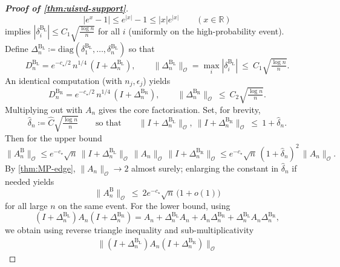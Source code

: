 \documentclass[11pt,a4paper]{article}
\newcommand{\op}{\mathcal{O}}
\newcommand{\diag}{\mathrm{diag}}
\begin{document}
\begin{proof}[\textbf{Proof of \cref{thm:uisvd-support}}]
\begin{equation}
|e^x-1|\le e^{|x|}-1\le |x|e^{|x|}\qquad (x\in\mathbb{R})
\end{equation}
implies $|\delta^{\mathrm{B_L}}_i|\le C_1\sqrt{\tfrac{\log n}{n}}$ for all $i$ (uniformly on the high-probability event). Define $\Delta^{\mathrm{B_L}}_{n}\coloneq \diag(\delta^{\mathrm{B_L}}_{1},\dots,\delta^{\mathrm{B_L}}_{n})$ so that
\begin{equation}\label{eq:DU-L-bnd}
D^{\mathrm{B_L}}_{n}=e^{-c_\star/2}\,n^{1/4}\,(I+\Delta^{\mathrm{B_L}}_{n}),
\qquad \|\Delta^{\mathrm{B_L}}_{n}\|_{\op}=\max_i|\delta^{\mathrm{B_L}}_i|\ \le\ C_1\sqrt{\tfrac{\log n}{n}}.
\end{equation}
An identical computation (with $n_j,\epsilon_j$) yields
\begin{equation}\label{eq:DU-R-bnd}
D^{\mathrm{B_R}}_{n}=e^{-c_\star/2}\,n^{1/4}\,(I+\Delta^{\mathrm{B_R}}_{n}),
\qquad \|\Delta^{\mathrm{B_R}}_{n}\|_{\op}\ \le\ C_2\sqrt{\tfrac{\log n}{n}}.
\end{equation}
Multiplying out with $A_n$ gives the core factorisation. Set, for brevity,
\begin{equation}
\hat \delta_n\coloneq \hat C\sqrt{\tfrac{\log n}{n}}\qquad\text{so that}\qquad
\|I+\Delta^{\mathrm{B_L}}_{n}\|_{\op},\ \|I+\Delta^{\mathrm{B_R}}_{n}\|_{\op}\ \le\ 1+\hat \delta_n.
\end{equation}
Then for the upper bound
\begin{equation}
\|A^{\mathrm{B}}_n\|_{\op}
\le e^{-c_\star}\sqrt n\,\|I+\Delta^{\mathrm{B_L}}_{n}\|_{\op}\,\|A_n\|_{\op}\,\|I+\Delta^{\mathrm{B_R}}_{n}\|_{\op}
\le e^{-c_\star}\sqrt n\,(1+\hat \delta_n)^2\,\|A_n\|_{\op}.
\end{equation}
By \cref{thm:MP-edge}, $\|A_n\|_{\op}\to 2$ almost surely; enlarging the constant in $\hat \delta_n$ if needed yields
\begin{equation}
\|A^{\mathrm{B}}_n\|_{\op}\ \le\ 2e^{-c_\star}\sqrt n\,\big(1+o(1)\big)
\end{equation}
for all large $n$ on the same event. For the lower bound, using
\begin{equation}
(I+\Delta^{\mathrm{B_L}}_{n})A_n(I+\Delta^{\mathrm{B_R}}_{n})=A_n+\Delta^{\mathrm{B_L}}_{n}A_n+A_n\Delta^{\mathrm{B_R}}_{n}+\Delta^{\mathrm{B_L}}_{n}A_n\Delta^{\mathrm{B_R}}_{n},
\end{equation}
we obtain using reverse triangle inequality and sub-multiplicativity
\begin{equation}
\begin{aligned}
\|(I+\Delta^{\mathrm{B_L}}_{n})A_n(I+\Delta^{\mathrm{B_R}}_{n})\|_{\op}

\end{aligned}
\end{equation}
\end{proof}
\end{document}
